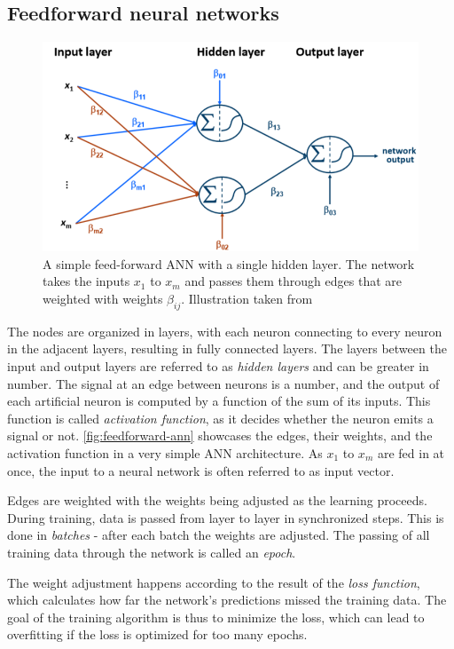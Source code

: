 \subsection{Feedforward neural networks}
\label{sec:feedforward-networks}
\begin{figure}[ht!]
    \centering
    \includegraphics[width=.85\textwidth]{gfx/feedforward-neural-network.png}
    \caption{A simple feed-forward ANN with a single hidden layer. The network takes the inputs $x_1$ to $x_m$ and passes them through edges that are weighted with weights $\beta_{ij}$. Illustration taken from \cite{lessmannBADS}}
    \label{fig:feedforward-ann}
\end{figure}

The nodes are organized in layers, with each neuron connecting to every neuron in the adjacent layers, resulting in fully connected layers. The layers between the input and output layers are referred to as \textit{hidden layers} and  can be greater in number. The signal at an edge between neurons is a number, and the output of each artificial neuron is computed by a function of the sum of its inputs. This function is called \textit{activation function}, as it decides whether the neuron emits a signal or not. \autoref{fig:feedforward-ann} showcases the edges, their weights, and the activation function in a very simple ANN architecture. As $x_1$ to $x_m$ are fed in at once, the input to a neural network is often referred to as input vector.

Edges are weighted with the weights being adjusted as the learning proceeds. During training, data is passed from layer to layer in synchronized steps. This is done in \textit{batches} - after each batch the weights are adjusted. The passing of all training data through the network is called an \textit{epoch}.

The weight adjustment happens according to the result of the \textit{loss function}, which calculates how far the network's predictions missed the training data. The goal of the training algorithm is thus to minimize the loss, which can lead to overfitting if the loss is optimized for too many epochs.

